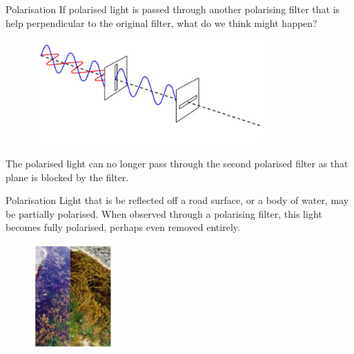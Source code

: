 \documentclass[../Main.tex]{subfiles}
\begin{document}
\begin{frame}{Polarisation}
    If polarised light is passed through another polarising filter that is help perpendicular to the original filter, what do we think might happen? \pause
    
    \begin{figure}
        \centering
        \includegraphics[height=4cm]{Waves_Images/2polarisingfilter.png}
    \end{figure}
    
    The polarised light can no longer pass through the second polarised filter as that plane is blocked by the filter.
\end{frame}

\begin{frame}{Polarisation}
    Light that is be reflected off a road surface, or a body of water, may be partially polarised. When observed through a polarising filter, this light becomes fully polarised, perhaps even removed entirely.
    
    \begin{figure}
        \centering
        \includegraphics[height=4cm]{Waves_Images/polarisingglasses.png}
    \end{figure}
\end{frame}
\end{document}
